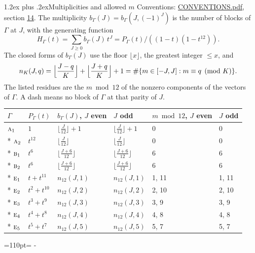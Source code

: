 \documentclass[10pt,a4paper]{article}
\makeatletter
\renewcommand\section{\@startsection{section}{1}{\z@}{-3ex plus -1ex minus -.2ex}%
  {1.2ex plus .2ex}{\normalfont\large\sffamily\bfseries\color{parttitle}}}
\newcommand{\needspace}[1]{\par\penalty-100\begingroup\dimen0=#1\relax\dimen2=\pagegoal
  \advance\dimen2-\pagetotal\ifdim\dimen0>\dimen2\relax\ifdim\dimen2>0pt\vfil\break\fi\fi
  \endgroup}
\numberwithin{equation}{section}
\newcommand{\irr}[1]{\text{\normalfont\scshape #1}}
\makeatother
\begin{document}
\section{Multiplicities and allowed \texorpdfstring{$m$}{m}}\label{s:multiplicities}
Conventions: \href{../../CONVENTIONS.pdf}{CONVENTIONS.pdf}, section \href{../../CONVENTIONS.pdf\#conv.14}{14}.
\leavevmode\label{n:function.generating}\label{n:index.generating.variable}\label{n:function.generating.numerator}The multiplicity $b_\Gamma(J) = b_\Gamma(J, (-1)^J)$ is the number of blocks of $\Gamma$ at $J$, with the generating function
\begin{equation}\label{e:gf}H_\Gamma(t) = \sum_{J\ge0} b_\Gamma(J)\,t^J = P_\Gamma(t)/((1-t)(1-t^{12})).\end{equation}
\leavevmode\label{n:delimiter.floor}\label{n:local.floor.x}\label{n:function.count}\label{n:index.modulus.K}\label{n:index.residue}The closed forms of $b_\Gamma(J)$ use the floor $\lfloor x\rfloor$, the greatest integer $\le x$, and
\begin{equation}\label{e:count}n_K(J,q) = \Bigl\lfloor\frac{J-q}{K}\Bigr\rfloor + \Bigl\lfloor\frac{J+q}{K}\Bigr\rfloor + 1 = \#\{m\in[-J,J] : m\equiv q \pmod{K}\}.\end{equation}
\leavevmode\label{n:head.parity}The listed residues are the $m \bmod 12$ of the nonzero components of the vectors of $\Gamma$. A dash means no block of $\Gamma$ at that parity of $J$.
{\small{\renewcommand{\arraystretch}{1.3}\begin{longtable}{@{}llllll@{}}\toprule
$\Gamma$ & $P_\Gamma(t)$ & $b_\Gamma(J)$, $J$ even & $J$ odd & $m \bmod 12$, $J$ even & $J$ odd\\\midrule\endhead
\bottomrule\endfoot\endlastfoot
$\irr{a}_{1}$ & $1$ & $\bigl\lfloor\tfrac{J}{12}\bigr\rfloor + 1$ & $\bigl\lfloor\tfrac{J}{12}\bigr\rfloor + 1$ & 0 & 0\\*
$\irr{a}_{2}$ & $t^{12}$ & $\bigl\lfloor\tfrac{J}{12}\bigr\rfloor$ & $\bigl\lfloor\tfrac{J}{12}\bigr\rfloor$ & 0 & 0\\*
$\irr{b}_{1}$ & $t^{6}$ & $\bigl\lfloor\tfrac{J+6}{12}\bigr\rfloor$ & $\bigl\lfloor\tfrac{J+6}{12}\bigr\rfloor$ & 6 & 6\\*
$\irr{b}_{2}$ & $t^{6}$ & $\bigl\lfloor\tfrac{J+6}{12}\bigr\rfloor$ & $\bigl\lfloor\tfrac{J+6}{12}\bigr\rfloor$ & 6 & 6\\*
$\irr{e}_{1}$ & $t + t^{11}$ & $n_{12}(J,1)$ & $n_{12}(J,1)$ & 1, 11 & 1, 11\\*
$\irr{e}_{2}$ & $t^{2} + t^{10}$ & $n_{12}(J,2)$ & $n_{12}(J,2)$ & 2, 10 & 2, 10\\*
$\irr{e}_{3}$ & $t^{3} + t^{9}$ & $n_{12}(J,3)$ & $n_{12}(J,3)$ & 3, 9 & 3, 9\\*
$\irr{e}_{4}$ & $t^{4} + t^{8}$ & $n_{12}(J,4)$ & $n_{12}(J,4)$ & 4, 8 & 4, 8\\*
$\irr{e}_{5}$ & $t^{5} + t^{7}$ & $n_{12}(J,5)$ & $n_{12}(J,5)$ & 5, 7 & 5, 7\\
\bottomrule\end{longtable}}}
\needspace{110pt}
\end{document}
